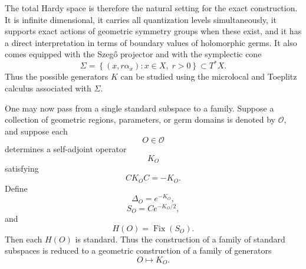 \documentclass[a4paper,11pt]{article}
\theoremstyle{definition}
\begin{document}
The total Hardy space is therefore the natural setting for the exact
construction.  It is infinite dimensional, it carries all quantization
levels simultaneously, it supports exact actions of geometric symmetry groups
when these exist, and it has a direct interpretation in terms of boundary
values of holomorphic germs.  It also comes equipped with the Szeg\H{o}
projector and with the symplectic cone
\begin{equation}
    \Sigma
    =
    \left\{
    (x,r\alpha_x):
    x\in X,\;
    r>0
    \right\}
    \subset
    T^*X.
\end{equation}
Thus the possible generators $K$ can be studied using the microlocal and
Toeplitz calculus associated with $\Sigma$.

One may now pass from a single standard subspace to a family.  Suppose a
collection of geometric regions, parameters, or germ domains is denoted by
$\mathcal O$, and suppose each
\begin{equation}
    O\in\mathcal O
\end{equation}
determines a self-adjoint operator
\begin{equation}
    K_O
\end{equation}
satisfying
\begin{equation}
    CK_OC=-K_O.
\end{equation}
Define
\begin{equation}
    \Delta_O=e^{-K_O},
\end{equation}
\begin{equation}
    S_O=Ce^{-K_O/2},
\end{equation}
and
\begin{equation}
    H(O)
    =
    \operatorname{Fix}(S_O).
    \label{eq:ssgq:HO}
\end{equation}
Then each $H(O)$ is standard.  Thus the construction of a family of standard
subspaces is reduced to a geometric construction of a family of generators
\begin{equation}
    O\longmapsto K_O.
\end{equation}
\end{document}
